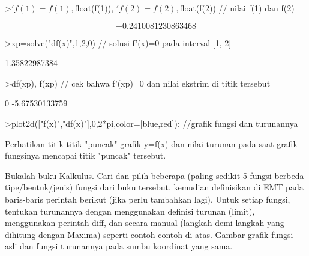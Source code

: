 \documentclass[a4paper,10pt]{article}
\begin{document}
\begin{eulernotebook}
\begin{eulercomment}
\begin{eulercomment}
\begin{eulercomment}
\begin{eulercomment}
\begin{eulercomment}
\begin{eulercomment}
\begin{eulercomment}
\begin{eulercomment}
\begin{euleroutput}
\end{euleroutput}
\begin{eulerprompt}
>$'f(1)=f(1), $float(f(1)), $'f(2)=f(2), $float(f(2)) // nilai f(1) dan f(2)
\end{eulerprompt}
\begin{eulerformula}
\[
-0.2410081230863468
\]
\end{eulerformula}
\begin{eulerprompt}
>xp=solve("df(x)",1,2,0) // solusi f'(x)=0 pada interval [1, 2]
\end{eulerprompt}
\begin{euleroutput}
  1.35822987384
\end{euleroutput}
\begin{eulerprompt}
>df(xp), f(xp) // cek bahwa f'(xp)=0 dan nilai ekstrim di titik tersebut
\end{eulerprompt}
\begin{euleroutput}
  0
  -5.67530133759
\end{euleroutput}
\begin{eulerprompt}
>plot2d(["f(x)","df(x)"],0,2*pi,color=[blue,red]): //grafik fungsi dan turunannya
\end{eulerprompt}
\begin{eulercomment}
Perhatikan titik-titik "puncak" grafik y=f(x) dan nilai turunan pada saat grafik fungsinya mencapai titik "puncak" tersebut.
\end{eulercomment}
\begin{eulercomment}
Bukalah buku Kalkulus. Cari dan pilih beberapa (paling sedikit 5
fungsi berbeda tipe/bentuk/jenis) fungsi dari buku tersebut, kemudian
definisikan di EMT pada baris-baris perintah berikut (jika perlu
tambahkan lagi). Untuk setiap fungsi, tentukan turunannya dengan
menggunakan definisi turunan (limit), menggunakan perintah diff, dan
secara manual (langkah demi langkah yang dihitung dengan Maxima)
seperti contoh-contoh di atas. Gambar grafik fungsi asli dan fungsi
turunannya pada sumbu koordinat yang sama.


\end{eulercomment}
\end{eulercomment}
\end{eulercomment}
\end{eulercomment}
\end{eulercomment}
\end{eulercomment}
\end{eulercomment}
\end{eulercomment}
\end{eulercomment}
\end{eulernotebook}
\end{document}
